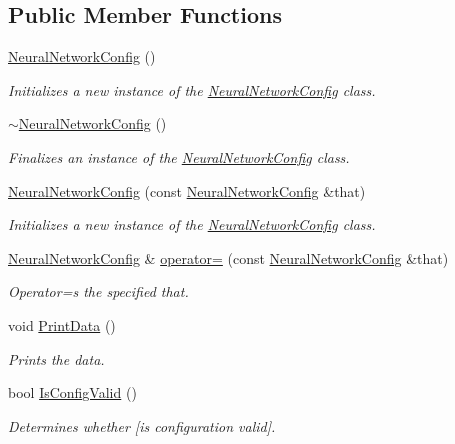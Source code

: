 \subsection*{Public Member Functions}
\begin{DoxyCompactItemize}
\item 
\hyperlink{class_neural_network_config_aac0a64831aa0011542cd0da2621b3e38}{Neural\+Network\+Config} ()
\begin{DoxyCompactList}\small\item\em Initializes a new instance of the \hyperlink{class_neural_network_config}{Neural\+Network\+Config} class. \end{DoxyCompactList}\item 
\hyperlink{class_neural_network_config_a311624b119b714c5282f00f5bbcff53c}{$\sim$\+Neural\+Network\+Config} ()
\begin{DoxyCompactList}\small\item\em Finalizes an instance of the \hyperlink{class_neural_network_config}{Neural\+Network\+Config} class. \end{DoxyCompactList}\item 
\hyperlink{class_neural_network_config_a6b6dc46d5fd9243c781e71b021dbb5ca}{Neural\+Network\+Config} (const \hyperlink{class_neural_network_config}{Neural\+Network\+Config} \&that)
\begin{DoxyCompactList}\small\item\em Initializes a new instance of the \hyperlink{class_neural_network_config}{Neural\+Network\+Config} class. \end{DoxyCompactList}\item 
\hyperlink{class_neural_network_config}{Neural\+Network\+Config} \& \hyperlink{class_neural_network_config_a17075aa3c368ec77e49902eda3bcff7b}{operator=} (const \hyperlink{class_neural_network_config}{Neural\+Network\+Config} \&that)
\begin{DoxyCompactList}\small\item\em Operator=s the specified that. \end{DoxyCompactList}\item 
void \hyperlink{class_neural_network_config_ace2d78217b376541455866a7360277c5}{Print\+Data} ()
\begin{DoxyCompactList}\small\item\em Prints the data. \end{DoxyCompactList}\item 
bool \hyperlink{class_neural_network_config_a3975927f8a58d466c19a791537860e55}{Is\+Config\+Valid} ()
\begin{DoxyCompactList}\small\item\em Determines whether \mbox{[}is configuration valid\mbox{]}. \end{DoxyCompactList}\end{DoxyCompactItemize}

